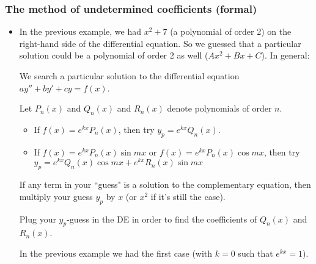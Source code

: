 \begin{frame}
\frametitle{The method of undetermined coefficients (formal)}{\scriptsize
\begin{itemize}
    \item In the previous example, we had $x^2+7$ (a polynomial of order 2) on the right-hand side of the differential equation. So we guessed that a particular solution could be a polynomial of order 2 as well ($Ax^2+Bx+C$). In general:\pause

    \begin{tcolorbox}[colback=blue!5,colframe=blue!75!black,title=Method of undetermined coefficients (FORMAL)]
    We search a particular solution to the differential equation $ay''+by'+cy=f(x)$.

    Let $P_n(x)$ and $Q_n(x)$ and $R_n(x)$ denote polynomials of order $n$.
    \begin{itemize}
        \item If $f(x)=e^{kx}P_n(x)$, then try $y_p=e^{kx}Q_n(x)$.
        \item If $f(x)=e^{kx}P_n(x)\sin mx$ or $f(x)=e^{kx}P_n(x)\cos mx$, then try $y_p=e^{kx}Q_n(x)\cos mx + e^{kx}R_n(x)\sin mx$
    \end{itemize}
    If any term in your ``guess" is a solution to the complementary equation, then multiply your guess $y_p$ by $x$ (or $x^2$ if it's still the case). 
    
    Plug your $y_p$-guess in the DE in order to find the coefficients of $Q_n(x)$ and $R_n(x)$.
    
    
    \end{tcolorbox}
    In the previous example we had the first case (with $k=0$ such that $e^{kx}=1$).

    
\end{itemize}}
\end{frame}

